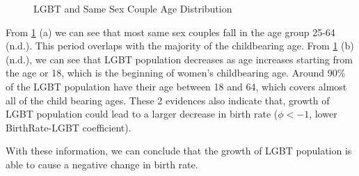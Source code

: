 \documentclass[
]{article}
\begin{document}
\begin{figure}

{\centering {}

}

\caption{LGBT and Same Sex Couple Age Distribution}\label{fig:fig-age-distribution}
\end{figure}

From \ref{fig:fig-age-distribution} (a) we can see that most same sex couples fall in the age group 25-64 (n.d.). This period overlaps with the majority of the childbearing age. From \ref{fig:fig-age-distribution} (b) (n.d.), we can see that LGBT population decreases as age increases starting from the age or 18, which is the beginning of women's childbearing age. Around 90\% of the LGBT population have their age between 18 and 64, which covers almost all of the child bearing ages. These 2 evidences also indicate that, growth of LGBT population could lead to a larger decrease in birth rate (\(\phi < -1\), lower BirthRate-LGBT coefficient).

With these information, we can conclude that the growth of LGBT population is able to cause a negative change in birth rate.
\end{document}
